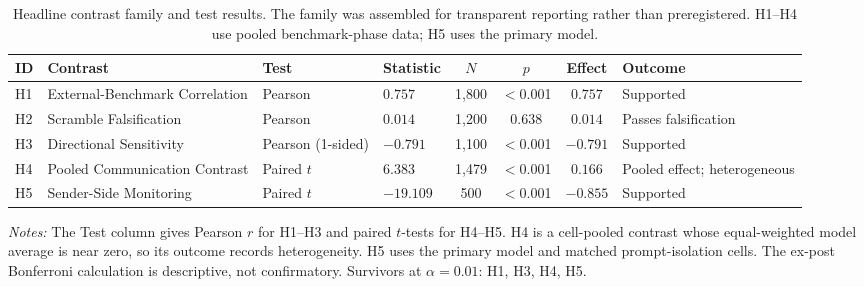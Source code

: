 \begin{table}[t]
\centering
\caption{Headline contrast family and test results. The family was assembled for transparent reporting rather than preregistered. H1--H4 use pooled benchmark-phase data; H5 uses the primary model.}
\label{tab:hypotheses}
\scriptsize
\setlength{\tabcolsep}{3pt}
\begin{tabular}{llllcccl}
\toprule
ID & Contrast & Test & Statistic & $N$ & $p$ & Effect & Outcome \\
\midrule
H1 & External-Benchmark Correlation & Pearson & $0.757$ & 1{,}800 & $<$0.001 & $0.757$ & Supported \\
H2 & Scramble Falsification & Pearson & $0.014$ & 1{,}200 & 0.638 & $0.014$ & Passes falsification \\
H3 & Directional Sensitivity & Pearson (1-sided) & $-0.791$ & 1{,}100 & $<$0.001 & $-0.791$ & Supported \\
H4 & Pooled Communication Contrast & Paired $t$ & $6.383$ & 1{,}479 & $<$0.001 & $0.166$ & Pooled effect; heterogeneous \\
H5 & Sender-Side Monitoring & Paired $t$ & $-19.109$ & 500 & $<$0.001 & $-0.855$ & Supported \\
\bottomrule
\end{tabular}
\begin{tablenotes}
\footnotesize\emph{Notes:} The Test column gives Pearson $r$ for H1--H3 and paired $t$-tests for H4--H5. H4 is a cell-pooled contrast whose equal-weighted model average is near zero, so its outcome records heterogeneity. H5 uses the primary model and matched prompt-isolation cells. The ex-post Bonferroni calculation is descriptive, not confirmatory. Survivors at $\alpha = 0.01$: H1, H3, H4, H5.
\end{tablenotes}
\end{table}
